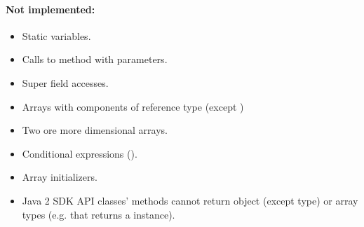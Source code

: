 \paragraph{Not implemented:}
\begin{itemize}
\item Static variables.
\item Calls to  method with parameters.
\item Super field accesses.
\item Arrays with components of reference type (except )
\item Two ore more dimensional arrays.
\item Conditional expressions ().
\item Array initializers.
\item Java 2 SDK API classes' methods cannot return object (except  type) or array types (e.g.  that returns a  instance).
\end{itemize}

